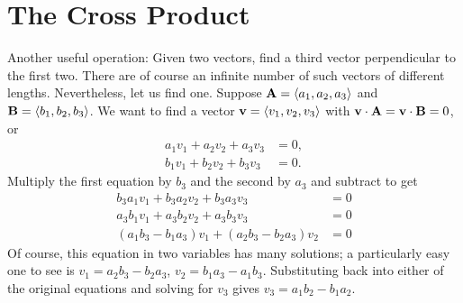 \section{The Cross Product}\label{sec:3Dcrossproduct}

Another useful operation: Given two vectors, find a third vector
perpendicular to the first two. There are of course an infinite number
of such vectors of different lengths. Nevertheless, let us find one.
Suppose ${\bf A}=\langle
a_1,a_2,a_3\rangle$ and ${\bf B}=\langle b_1,b_2,b_3\rangle$. We want
to find a vector ${\bf v} = \langle v_1,v_2,v_3\rangle$ with
${\bf v}\cdot{\bf A}={\bf v}\cdot{\bf B}=0$, or
\begin{align*}
  a_1v_1+a_2v_2+a_3v_3&=0,	\\
  b_1v_1+b_2v_2+b_3v_3&=0.
\end{align*}
Multiply the first equation by $b_3$ and the second by $a_3$ and
subtract to get
\begin{align*}
  b_3a_1v_1+b_3a_2v_2+b_3a_3v_3&=0	\\
  a_3b_1v_1+a_3b_2v_2+a_3b_3v_3&=0	\\
  (a_1b_3-b_1a_3)v_1 + (a_2b_3-b_2a_3)v_2&=0
\end{align*}
Of course, this equation in two variables has many solutions; a
particularly easy one to see is $v_1=a_2b_3-b_2a_3$,
$v_2=b_1a_3-a_1b_3$. Substituting back into either of the original
equations and solving for $ v_3$ gives $v_3=a_1b_2-b_1a_2$.

